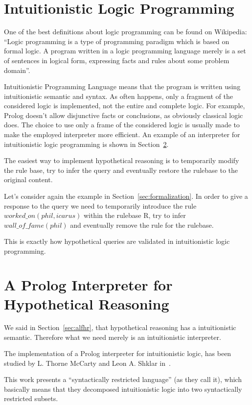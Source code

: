 \section{Intuitionistic Logic Programming}
\label{sec:ilp}
One of the best definitions about logic programming can be found on Wikipedia:
``Logic programming is a type of programming paradigm which is based on formal logic.
A program written in a logic programming language merely is a set of sentences in
logical form, expressing facts and rules about some problem domain''.

Intuitionistic Programming Language means that the program is written using
intuitionistic semantic and syntax. As often happens, only a fragment of
the considered logic is implemented, not the entire and complete logic.
For example, Prolog doesn't allow disjunctive facts or conclusions, as obviously
classical logic does. The choice to use only a frame of the considered logic is usually made
to make the employed interpreter more efficient. An example of an interpreter for
intuitionistic logic programming is shown in Section~\ref{sec:apifhr}.

The easiest way to implement hypothetical reasoning is to temporarily modify the rule
base, try to infer the query and eventually restore the rulebase to the original content.

Let's consider again the example in Section~\ref{sec:formalization}. In order
to give a response to the query we need to temporarily introduce the rule
$worked\_on(phil, icarus)$ within the rulebase R, try to infer $wall\_of\_fame(phil)$
and eventually remove the rule for the rulebase.

This is exactly how hypothetical queries are validated in intuitionistic logic
programming.

\section{A Prolog Interpreter for Hypothetical Reasoning}
\label{sec:apifhr}
We said in Section~\ref{sec:alfhr}, that hypothetical reasoning has a intuitionistic semantic.
Therefore what we need merely is an intuitionistic interpreter.

The implementation of a Prolog interpreter for intuitionistic logic,
has been studied by L. Thorne McCarty and Leon A. Shklar in~\cite{McCartyS94}.

This work presents a ``syntactically restricted language'' (as they call it), which basically
means that they decomposed intuitionistic logic into two syntactically restricted subsets.

